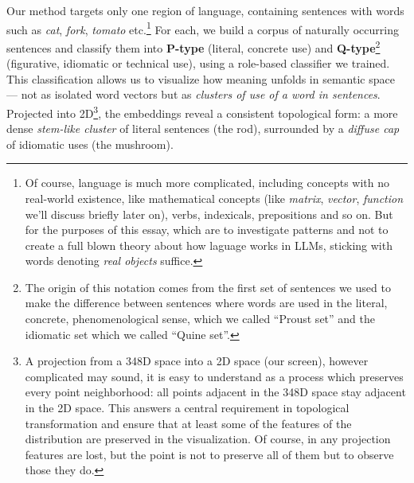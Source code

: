 \documentclass[12pt]{article}
\begin{document}
Our method targets only one region of language, containing sentences with words such as \emph{cat}, \emph{fork}, \emph{tomato} etc.\footnote{Of course, language is much more complicated, including concepts with no real-world existence, like mathematical concepts (like \emph{matrix}, \emph{vector}, \emph{function} we'll discuss briefly later on), verbs, indexicals, prepositions and so on. But for the purposes of this essay, which are to investigate patterns and not to create a full blown theory about how laguage works in LLMs, sticking with words denoting \emph{real objects} suffice.} For each, we build a corpus of naturally occurring sentences and classify them into \textbf{P-type} (literal, concrete use) and \textbf{Q-type}\footnote{The origin of this notation comes from the first set of sentences we used to make the difference between sentences where words are used in the literal, concrete, phenomenological sense, which we called ``Proust set'' and the idiomatic set which we called ``Quine set''.} (figurative, idiomatic or technical use), using a role-based classifier we trained. This classification allows us to visualize how meaning unfolds in semantic space --- not as isolated word vectors but as \emph{clusters of use of a word in sentences}. Projected into 2D\footnote{A projection from a 348D space into a 2D space (our screen), however complicated may sound, it is easy to understand as a process which preserves every point neighborhood: all points adjacent in the 348D space stay adjacent in the 2D space. This answers a central requirement in topological transformation and ensure that at least some of the features of the distribution are preserved in the visualization. Of course, in any projection features are lost, but the point is not to preserve all of them but to observe those they do.}, the embeddings reveal a consistent topological form: a more dense \emph{stem-like cluster} of literal sentences (the rod), surrounded by a \emph{diffuse cap} of idiomatic uses (the mushroom).
\end{document}
